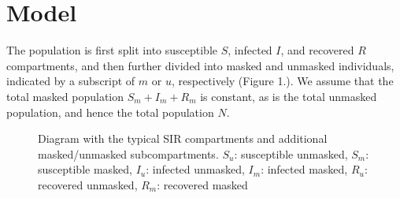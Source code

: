 \documentclass[11pt]{article}
\begin{document}
\section*{Model}
The population is first split into susceptible $S$, infected $I$, and recovered $R$ compartments, and then further divided into masked and unmasked individuals, indicated by a subscript of $m$ or $u$, respectively (Figure 1.). We assume that the total masked population $S_{m} + I_{m} + R_{m}$ is constant, as is the total unmasked population, and hence the total population $N$.


\begin{figure}[ht]
\caption{Diagram with the typical SIR compartments and additional masked/unmasked subcompartments. $S_{u}$: susceptible unmasked, $S_{m}$: susceptible masked, $I_{u}$: infected unmasked, $I_{m}$: infected masked, $R_{u}$: recovered unmasked, $R_{m}$: recovered masked}
\end{figure}

\vspace{1cm}
\end{document}
